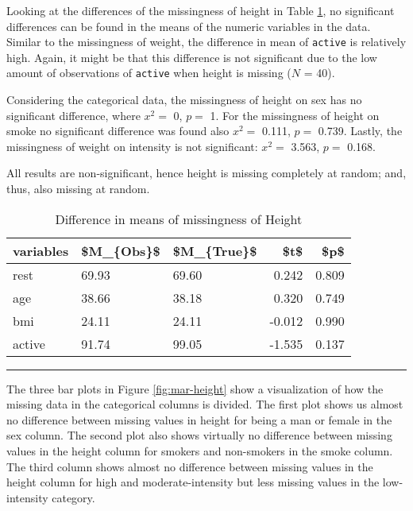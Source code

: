 \documentclass[
]{article}
\begin{document}
Looking at the differences of the missingness of height in Table \ref{tab:missH}, no significant differences can be found in the means of the numeric variables in the data. Similar to the missingness of weight, the difference in mean of \texttt{active} is relatively high. Again, it might be that this difference is not significant due to the low amount of observations of \texttt{active} when height is missing (\(N\) = 40).

Considering the categorical data, the missingness of height on sex has no significant difference, where \(x^2 =\) 0, \(p =\) 1. For the missingness of height on smoke no significant difference was found also \(x^2 =\) 0.111, \(p =\) 0.739. Lastly, the missingness of weight on intensity is not significant: \(x^2 =\) 3.563, \(p =\) 0.168.

All results are non-significant, hence height is missing completely at random; and, thus, also missing at random.

\begin{table}

\caption{\label{tab:missH}Difference in means of missingness of Height}
\centering
\begin{tabular}[t]{l|l|l|r|r}
\hline
variables & \$M\_\{Obs\}\$ & \$M\_\{True\}\$ & \$t\$ & \$p\$\\
\hline
rest & 69.93 & 69.60 & 0.242 & 0.809\\
\hline
age & 38.66 & 38.18 & 0.320 & 0.749\\
\hline
bmi & 24.11 & 24.11 & -0.012 & 0.990\\
\hline
active & 91.74 & 99.05 & -1.535 & 0.137\\
\hline
\end{tabular}
\end{table}

\begin{center}\rule{0.5\linewidth}{0.5pt}\end{center}

The three bar plots in Figure \ref{fig:mar-height} show a visualization of how the missing data in the categorical columns is divided. The first plot shows us almost no difference between missing values in height for being a man or female in the sex column. The second plot also shows virtually no difference between missing values in the height column for smokers and non-smokers in the smoke column. The third column shows almost no difference between missing values in the height column for high and moderate-intensity but less missing values in the low-intensity category.
\end{document}
